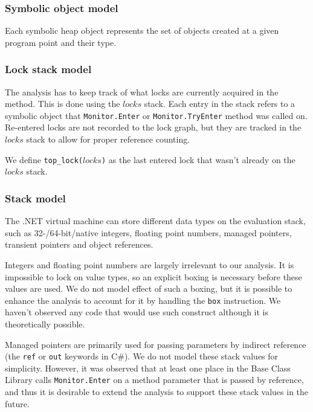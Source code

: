 \subsubsection{Symbolic object model}

Each symbolic heap object represents the set of objects created at a given program point and their type.

\subsubsection{Lock stack model}

The analysis has to keep track of what locks are currently acquired in the method. This is done using the $locks$ stack. Each entry in the stack refers to a symbolic object that \texttt{Monitor.Enter} or \texttt{Monitor.TryEnter} method was called on. Re-entered locks are not recorded to the lock graph, but they are tracked in the $locks$ stack to allow for proper reference counting.

We define \texttt{top\_lock($locks$)} as the last entered lock that wasn't already on the $locks$ stack.

\subsubsection{Stack model}

The .NET virtual machine can store different data types on the evaluation stack, such as 32-/64-bit/native integers, floating point numbers, managed pointers, transient pointers and object references.

Integers and floating point numbers are largely irrelevant to our analysis. It is impossible to lock on value types, so an explicit boxing is necessary before these values are used. We do not model effect of such a boxing, but it is possible to enhance the analysis to account for it by handling the \texttt{box} instruction. We haven't observed any code that would use such construct although it is theoretically possible.

Managed pointers are primarily used for passing parameters by indirect reference (the \texttt{ref} or \texttt{out} keywords in C\#). We do not model these stack values for simplicity. However, it was observed that at least one place in the Base Class Library calls \texttt{Monitor.Enter} on a method parameter that is passed by reference, and thus it is desirable to extend the analysis to support these stack values in the future.


